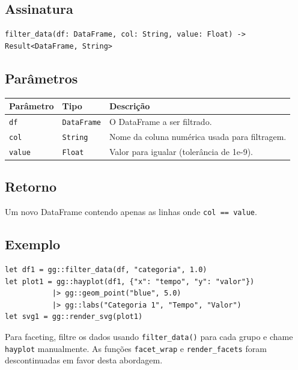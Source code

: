 \documentclass[12pt, a4paper, oneside]{book}
\newcommand{\code}[1]{\texttt{#1}}
\begin{document}
\subsection*{Assinatura}

\begin{lstlisting}[style=inline]
filter_data(df: DataFrame, col: String, value: Float) -> Result<DataFrame, String>
\end{lstlisting}

\subsection*{Parâmetros}

\begin{tabularx}{\textwidth}{@{}lL{2.5cm}X@{}}
  \toprule
  \textbf{Parâmetro} & \textbf{Tipo} & \textbf{Descrição} \\
  \midrule
  \code{df}      & \code{DataFrame} & O DataFrame a ser filtrado. \\[4pt]
  \code{col}     & \code{String}   & Nome da coluna numérica usada para filtragem. \\[4pt]
  \code{value}   & \code{Float}    & Valor para igualar (tolerância de 1e-9). \\
  \bottomrule
\end{tabularx}

\subsection*{Retorno}

Um novo DataFrame contendo apenas as linhas onde \code{col == value}.

\subsection*{Exemplo}

\begin{lstlisting}[caption={Faceting manual com filter\_data}]
let df1 = gg::filter_data(df, "categoria", 1.0)
let plot1 = gg::hayplot(df1, {"x": "tempo", "y": "valor"})
           |> gg::geom_point("blue", 5.0)
           |> gg::labs("Categoria 1", "Tempo", "Valor")
let svg1 = gg::render_svg(plot1)
\end{lstlisting}

\begin{tipbox}[title={\textbf{Nota:} Faceting manual}]
  Para faceting, filtre os dados usando \code{filter\_data()} para cada grupo e chame \code{hayplot} manualmente.
  As funções \code{facet\_wrap} e \code{render\_facets} foram descontinuadas em favor desta abordagem.
\end{tipbox}
\end{document}
